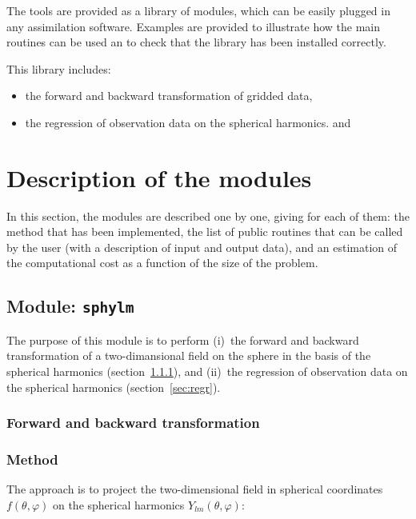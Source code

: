 \documentclass[11pt]{article}
\begin{document}
The tools are provided as a library of modules,
which can be easily plugged in any assimilation software.
Examples are provided to illustrate
how the main routines can be used an
to check that the library has been installed correctly.

This library includes:

\begin{itemize}
\item the forward and backward transformation of gridded data,
\item the regression of observation data on the spherical harmonics. and
\end{itemize}

\clearpage

\pagestyle{plain}

\section{Description of the modules}

In this section,
the modules are described one by one,
giving for each of them:
the method that has been implemented,
the list of public routines that can be called by the user
(with a description of input and output data), and
an estimation of the computational cost
as a function of the size of the problem.

\subsection{Module: {\tt sphylm}}

The purpose of this module is to perform
(i)~the forward and backward transformation
of a two-dimansional field on the sphere
in the basis of the spherical harmonics
(section~\ref{sec:tran}), and
(ii)~the regression of observation data
on the spherical harmonics (section~\ref{sec:regr}).

\subsubsection{Forward and backward transformation}
\label{sec:tran}

\subsubsection*{Method}

The approach is to project the two-dimensional field
in spherical coordinates $f(\theta,\varphi)$ on the spherical harmonics
$Y_{lm}(\theta,\varphi)$:
\end{document}
